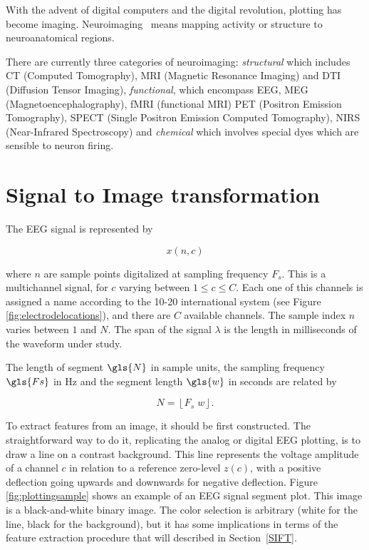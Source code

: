 
\begin{story}[Neuroimaging]
With the advent of digital computers and the digital revolution, plotting has become imaging.  Neuroimaging~\cite{Freeman2013} means mapping activity or structure to neuroanatomical regions.

There are currently three categories of neuroimaging: \textit{structural} which includes CT (Computed Tomography), MRI (Magnetic Resonance Imaging) and DTI (Diffusion Tensor Imaging), \textit{functional}, which encompass EEG, MEG (Magnetoencephalography), fMRI (functional MRI) PET (Positron Emission Tomography), SPECT (Single Positron Emission Computed Tomography), NIRS (Near-Infrared Spectroscopy) and \textit{chemical} which involves special dyes which are sensible to neuron firing.
\end{story}

\section{Signal to Image transformation}

The EEG signal is represented by

\begin{equation}
x(n,c)
\label{eq:zerolevel}
\end{equation}

\noindent where $n$ are sample points digitalized at sampling frequency $F_s$.  This is a multichannel signal, for $c$ varying between  $1 \leq c \leq C$.  Each one of this channels is assigned a name according to the 10-20 international system (see Figure \ref{fig:electrodelocations}), and there are $C$ available channels. The sample index $n$ varies between $1$ and $N$.  The span of the signal $\lambda$ is the length in milliseconds of the waveform under study. 

The length of segment $\gls{N}$ in sample units, the sampling frequency $\gls{Fs}$ in \si{\hertz} and the segment length $\gls{w}$ in seconds are related by

\begin{equation}
N = \left\lfloor F_s \; w \right\rfloor.
\label{eq:segmentlength}
\end{equation}

\vspace{3pt}

To extract features from an image, it should be first constructed.  The straightforward way to do it, replicating the analog or digital EEG plotting, is to draw a line on a contrast background.  This line represents the voltage amplitude of a channel $c$ in relation to a reference zero-level $z(c)$, with a positive deflection going upwards and downwards for negative deflection.  Figure \ref{fig:plottingsample} shows an example of an EEG signal segment plot.  This image is a black-and-white binary image.  The color selection is arbitrary (white for the line, black for the background), but it has some implications in terms of the feature extraction procedure that will described in Section~\ref{SIFT}.

